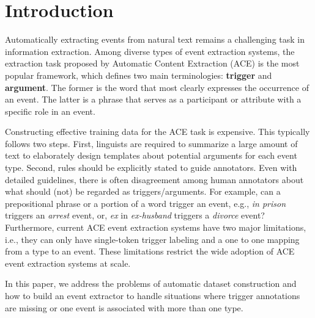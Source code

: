 \section{Introduction}
Automatically extracting events from natural text remains a challenging task in information extraction. Among diverse
types of event extraction systems, the extraction task proposed by Automatic Content Extraction (ACE)
\cite{doddington2004automatic} is the most popular framework, which defines two main terminologies: \textbf{trigger}
and \textbf{argument}. The former is the word that most clearly expresses the occurrence of an event. The latter is a
phrase that serves as a participant or attribute with a specific role in an event.

Constructing effective training data for the ACE task is expensive. This typically follows two steps. First, linguists
are required to summarize a large amount of text to elaborately design templates about potential arguments for each
event type. Second, rules should be explicitly stated to guide annotators. Even with detailed guidelines, there is
often disagreement among human annotators about what should (not) be regarded as triggers/arguments. For example, can a
prepositional phrase or a portion of a word trigger an event, e.g., \textit{in prison} triggers an \emph{arrest} event,
or, \textit{ex} in \textit{ex-husband} triggers a \emph{divorce} event?
Furthermore, current ACE event extraction systems have two major limitations, i.e., they can only have single-token trigger labeling and a one to one mapping from a type to an event. 
These limitations restrict the wide adoption of ACE event extraction systems at scale. 


In this paper, we address the problems of automatic dataset construction and how to build an event extractor to handle situations where 
trigger annotations are missing or one event is associated with more than one type. 


